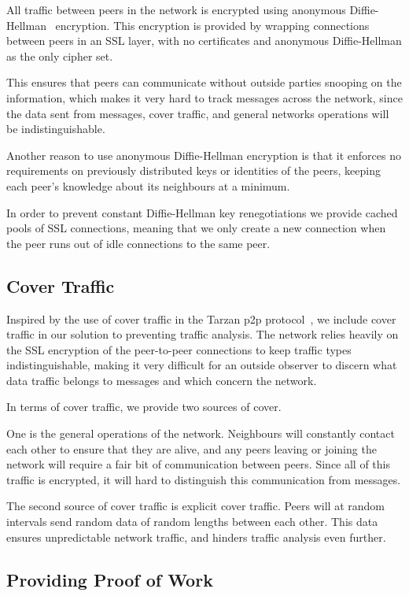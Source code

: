 All traffic between peers in the network is encrypted using anonymous Diffie-Hellman~\citep{DH} encryption. This encryption is provided by wrapping connections between peers in an SSL layer, with no certificates and anonymous Diffie-Hellman as the only cipher set.

This ensures that peers can communicate without outside parties snooping on the information, which makes it very hard to track messages across the network, since the data sent from messages, cover traffic, and general networks operations will be indistinguishable.

Another reason to use anonymous Diffie-Hellman encryption is that it enforces no requirements on previously distributed keys or identities of the peers, keeping each peer's knowledge about its neighbours at a minimum.

In order to prevent constant Diffie-Hellman key renegotiations we provide cached pools of SSL connections, meaning that we only create a new connection when the peer runs out of idle connections to the same peer.

\subsection{Cover Traffic}

Inspired by the use of cover traffic in the Tarzan p2p protocol~\citep{tarzan}, we include cover traffic in our solution to preventing traffic analysis. The network relies heavily on the SSL encryption of the peer-to-peer connections to keep traffic types indistinguishable, making it very difficult for an outside observer to discern what data traffic belongs to messages and which concern the network.

In terms of cover traffic, we provide two sources of cover.

One is the general operations of the network. Neighbours will constantly contact each other to ensure that they are alive, and any peers leaving or joining the network will require a fair bit of communication between peers. Since all of this traffic is encrypted, it will hard to distinguish this communication from messages.

The second source of cover traffic is explicit cover traffic. Peers will at random intervals send random data of random lengths between each other. This data ensures unpredictable network traffic, and hinders traffic analysis even further.

\subsection{Providing Proof of Work}

